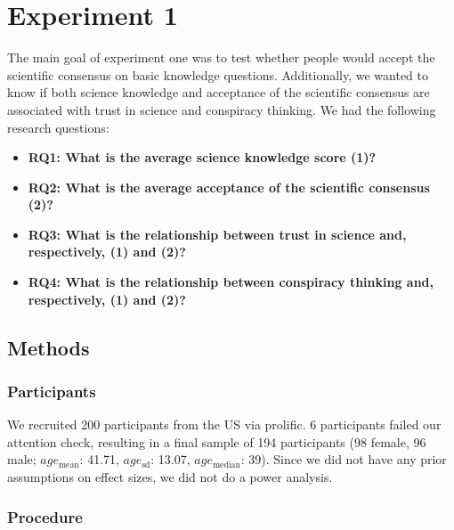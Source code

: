 \documentclass[
  doc,floatsintext]{apa6}
\begin{document}
\hypertarget{experiment-1}{%
\section{Experiment 1}\label{experiment-1}}

The main goal of experiment one was to test whether people would accept the scientific consensus on basic knowledge questions. Additionally, we wanted to know if both science knowledge and acceptance of the scientific consensus are associated with trust in science and conspiracy thinking. We had the following research questions:

\begin{itemize}
\item
  \textbf{RQ1: What is the average science knowledge score (1)?}
\item
  \textbf{RQ2: What is the average acceptance of the scientific consensus (2)?}
\item
  \textbf{RQ3: What is the relationship between trust in science and, respectively, (1) and (2)?}
\item
  \textbf{RQ4: What is the relationship between conspiracy thinking and, respectively, (1) and (2)?}
\end{itemize}

\hypertarget{methods}{%
\subsection{Methods}\label{methods}}

\hypertarget{participants}{%
\subsubsection{Participants}\label{participants}}

We recruited 200 participants from the US via prolific. 6 participants failed our attention check, resulting in a final sample of 194 participants (98 female, 96 male; \(age_\text{mean}\): 41.71, \(age_\text{sd}\): 13.07, \(age_\text{median}\): 39). Since we did not have any prior assumptions on effect sizes, we did not do a power analysis.

\hypertarget{procedure}{%
\subsubsection{Procedure}\label{procedure}}
\end{document}
